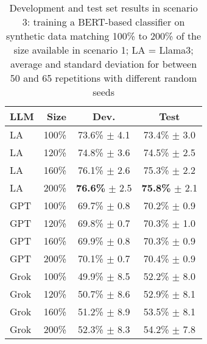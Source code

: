 
\begin{table}
\centering
\begin{tabular}{lrcc}
\textbf{LLM}  &
\textbf{Size}  &
\textbf{Dev.} & \textbf{Test}  \\
\hline
LA & 100\%  &   73.6\% $\pm$    4.1  &   73.4\% $\pm$    3.0  \\
LA & 120\%  &   74.8\% $\pm$    3.6  &   74.5\% $\pm$    2.5  \\
LA & 160\%  &   76.1\% $\pm$    2.6  &   75.3\% $\pm$    2.2  \\
LA & 200\%  & \textbf{76.6\%} $\pm$    2.5  & \textbf{75.8\%} $\pm$    2.1  \\
\hline
GPT    & 100\%  &   69.7\% $\pm$    0.8  &   70.2\% $\pm$    0.9  \\
GPT    & 120\%  &   69.8\% $\pm$    0.7  &   70.3\% $\pm$    1.0  \\
GPT    & 160\%  &   69.9\% $\pm$    0.8  &   70.3\% $\pm$    0.9  \\
GPT    & 200\%  &   70.1\% $\pm$    0.7  &   70.4\% $\pm$    0.9  \\
\hline
Grok   & 100\%  &   49.9\% $\pm$    8.5  &   52.2\% $\pm$    8.0  \\
Grok   & 120\%  &   50.7\% $\pm$    8.6  &   52.9\% $\pm$    8.1  \\
Grok   & 160\%  &   51.2\% $\pm$    8.9  &   53.5\% $\pm$    8.1  \\
Grok   & 200\%  &  52.3\% $\pm$    8.3  &  54.2\% $\pm$    7.8  \\
\hline
\end{tabular}
\caption{Development and test set results in scenario 3:
    training a BERT-based classifier on synthetic data matching
    100\% to 200\% of the size available in scenario 1;
    LA = Llama3;
    average and standard deviation for between 50 and 65 repetitions with different random seeds}
\label{t:results-s3-s-3}
\end{table}
